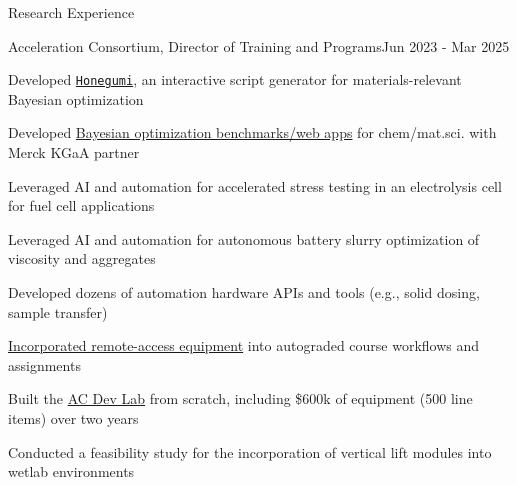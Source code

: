 \documentclass{resume} %
\begin{document}
\begin{rSection}{Research Experience}
\begin{rSubsection}{Acceleration Consortium, Director of Training and Programs}{Jun 2023 - Mar 2025}{} \\
\item Developed \href{https://honegumi.readthedocs.io/en/latest/}{\texttt{Honegumi}}, an interactive script generator for materials-relevant Bayesian optimization
\item Developed \href{https://huggingface.co/collections/AccelerationConsortium/optimization-benchmarks-66a44daf10de1a0335f28826}{Bayesian optimization benchmarks/web apps} for chem/mat.sci. with Merck KGaA partner
\item Leveraged AI and automation for accelerated stress testing in an electrolysis cell for fuel cell applications
\item Leveraged AI and automation for autonomous battery slurry optimization of viscosity and aggregates
\item Developed dozens of automation hardware APIs and tools (e.g., solid dosing, sample transfer)
\item \href{https://github.com/ACC-HelloWorld/1-running-the-demo/}{Incorporated remote-access equipment} into autograded course workflows and assignments
\item Built the \href{https://ac-training-lab.readthedocs.io/}{AC Dev Lab} from scratch, including \$600k of equipment (500 line items) over two years
\item Conducted a feasibility study for the incorporation of vertical lift modules into wetlab environments %
\end{rSubsection}


\end{rSection}
\end{document}

